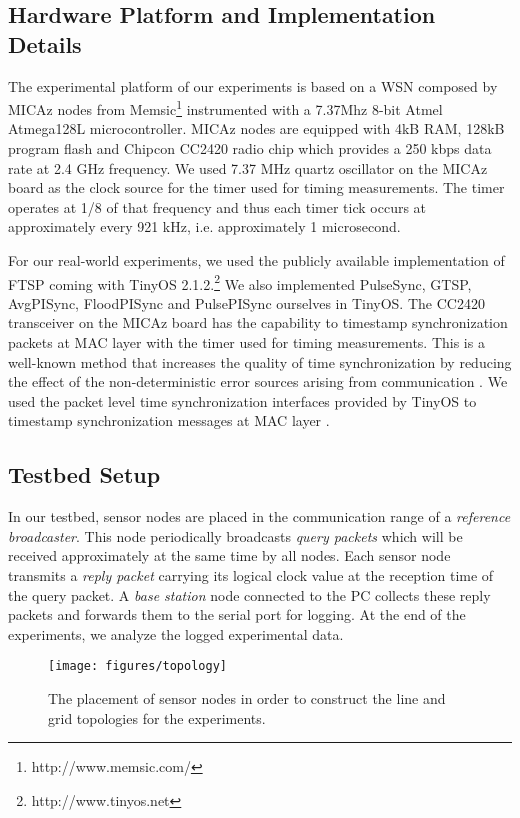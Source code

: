 \documentclass[english,a4paper,10pt,final]{article}
\numberwithin{equation}{section}
\numberwithin{figure}{section}
\begin{document}
\subsection{Hardware Platform and Implementation Details}

The experimental platform of our experiments is based on a WSN composed by MICAz nodes from Memsic\footnote{http://www.memsic.com/} instrumented with a 7.37Mhz 8-bit Atmel Atmega128L microcontroller. MICAz nodes are equipped with 4kB RAM, 128kB program flash and Chipcon CC2420 radio chip which provides a 250 kbps data rate at 2.4 GHz frequency. We used 7.37 MHz quartz oscillator on the MICAz board as the clock source for the timer used for timing measurements. The timer operates at 1/8 of that frequency and thus each timer tick occurs at approximately every 921 kHz, i.e. approximately 1 microsecond.

For our real-world experiments, we used the publicly available implementation of FTSP coming with TinyOS 2.1.2.\footnote{http://www.tinyos.net} We also implemented PulseSync, GTSP, AvgPISync, FloodPISync and PulsePISync ourselves in TinyOS. The CC2420 transceiver on the MICAz board has the capability to timestamp synchronization packets at MAC layer  with the timer used for timing measurements. This is a well-known method that increases the quality of time synchronization by reducing the effect of the non-deterministic error sources arising from communication \cite{Maroti2004}. We used the packet level time synchronization interfaces provided by TinyOS to timestamp synchronization messages at MAC layer \cite{Packet-level-time-synchronization:2008}.

\subsection{Testbed Setup}

In our testbed, sensor nodes are placed in the communication range of a \emph{reference broadcaster}. This node periodically broadcasts \emph{query packets} which will be received approximately at the same time by all nodes. Each sensor node transmits a \emph{reply packet} carrying its logical clock value at the reception time of the query packet. A \emph{base station} node connected to the PC collects these reply packets and forwards them to the serial port for logging. At the end of the experiments, we analyze the logged experimental data. 

\begin{figure}
\center

\texttt{[image: figures/topology]}

\caption{\label{fig:topology} The placement of sensor nodes in order to construct the line
and grid topologies for the experiments.}
\end{figure} 
\end{document}
